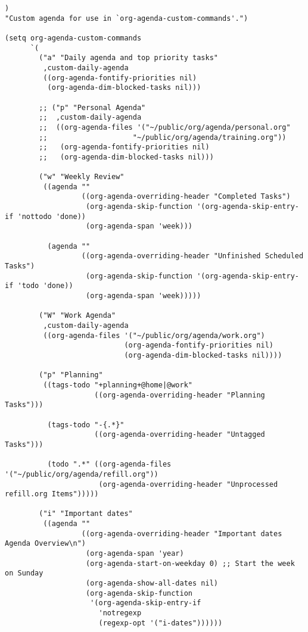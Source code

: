 \documentclass[11pt]{article}
\begin{document}
\begin{verbatim}
)
"Custom agenda for use in `org-agenda-custom-commands'.")

(setq org-agenda-custom-commands
      `(
        ("a" "Daily agenda and top priority tasks"
         ,custom-daily-agenda
         ((org-agenda-fontify-priorities nil)
          (org-agenda-dim-blocked-tasks nil)))

        ;; ("p" "Personal Agenda"
        ;;  ,custom-daily-agenda
        ;;  ((org-agenda-files '("~/public/org/agenda/personal.org"
        ;; 					  "~/public/org/agenda/training.org"))
        ;;   (org-agenda-fontify-priorities nil)
        ;;   (org-agenda-dim-blocked-tasks nil)))

        ("w" "Weekly Review"
         ((agenda ""
                  ((org-agenda-overriding-header "Completed Tasks")
                   (org-agenda-skip-function '(org-agenda-skip-entry-if 'nottodo 'done))
                   (org-agenda-span 'week)))

          (agenda ""
                  ((org-agenda-overriding-header "Unfinished Scheduled Tasks")
                   (org-agenda-skip-function '(org-agenda-skip-entry-if 'todo 'done))
                   (org-agenda-span 'week)))))

        ("W" "Work Agenda"
         ,custom-daily-agenda
         ((org-agenda-files '("~/public/org/agenda/work.org")
                            (org-agenda-fontify-priorities nil)
                            (org-agenda-dim-blocked-tasks nil))))

        ("p" "Planning"
         ((tags-todo "+planning+@home|@work"
                     ((org-agenda-overriding-header "Planning Tasks")))

          (tags-todo "-{.*}"
                     ((org-agenda-overriding-header "Untagged Tasks")))

          (todo ".*" ((org-agenda-files '("~/public/org/agenda/refill.org"))
                      (org-agenda-overriding-header "Unprocessed refill.org Items")))))

        ("i" "Important dates"
         ((agenda ""
                  ((org-agenda-overriding-header "Important dates Agenda Overview\n")
                   (org-agenda-span 'year)
                   (org-agenda-start-on-weekday 0) ;; Start the week on Sunday
                   (org-agenda-show-all-dates nil)
                   (org-agenda-skip-function
                    '(org-agenda-skip-entry-if
                      'notregexp
                      (regexp-opt '("i-dates"))))))


\end{verbatim}
\end{document}
